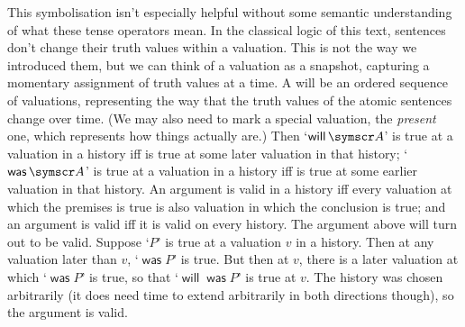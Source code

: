 This symbolisation isn't especially helpful without some semantic understanding of what these tense operators mean. In the classical logic of this text, sentences don't change their truth values within a valuation. This is not the way we introduced them, but we can think of a valuation as a snapshot, capturing a momentary assignment of truth values at a time. A  will be an ordered sequence of valuations, representing the way that the truth values of the atomic sentences change over time. (We may also need to mark a special valuation, the \emph{present} one, which represents how things actually are.) Then `$\mathop{\mathsf{will}}\meta{A}$' is true at a valuation in a history iff  is true at some later valuation in that history; `$\mathop{\mathsf{was}}\meta{A}$' is true at a valuation in a history iff  is true at some earlier valuation in that history. An argument is valid in a history iff every valuation at which the premises is true is also valuation in which the conclusion is true; and an argument is valid iff it is valid on every history. The argument above will turn out to be valid. Suppose `$P$' is true at a valuation $v$ in a history. Then at any valuation later than $v$, `$\mathop{\mathsf{was}}P$' is true. But then at $v$, there is a later valuation at which `$\mathop{\mathsf{was}}P$' is true, so that `$\mathop{\mathsf{will}}\mathop{\mathsf{was}}P$' is true at $v$. The history was chosen arbitrarily (it does need time to extend arbitrarily in both directions though), so the argument is valid.

